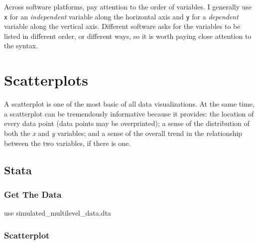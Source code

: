 \documentclass[
  letterpaper,
  DIV=11,
  numbers=noendperiod]{scrreprt}
\newenvironment{Shaded}{\begin{snugshade}}{\end{snugshade}}
\newcommand{\KeywordTok}[1]{\textcolor[rgb]{0.00,0.23,0.31}{#1}}
\newcommand{\NormalTok}[1]{\textcolor[rgb]{0.00,0.23,0.31}{#1}}
\begin{document}
\begin{tcolorbox}[enhanced jigsaw, coltitle=black, opacityback=0, title=\textcolor{quarto-callout-caution-color}{\faFire}\hspace{0.5em}{Order of Variables}, toprule=.15mm, colback=white, bottomrule=.15mm, colbacktitle=quarto-callout-caution-color!10!white, breakable, bottomtitle=1mm, arc=.35mm, left=2mm, colframe=quarto-callout-caution-color-frame, opacitybacktitle=0.6, leftrule=.75mm, titlerule=0mm, rightrule=.15mm, toptitle=1mm]

Across software platforms, pay attention to the order of variables. I
generally use \texttt{x} for an \emph{independent} variable along the
horizontal axis and \texttt{y} for a \emph{dependent} variable along the
vertical axis. Different software asks for the variables to be listed in
different order, or different ways, so it is worth paying close
attention to the syntax.

\end{tcolorbox}

\section{Scatterplots}\label{scatterplots}

A scatterplot is one of the most basic of all data visualizations. At
the same time, a scatterplot can be tremendously informative because it
provides: the location of every data point (data points may be
overprinted); a sense of the distribution of both the \emph{x} and
\emph{y} variables; and a sense of the overall trend in the relationship
between the two variables, if there is one.

\subsection{Stata}

\subsubsection{Get The Data}\label{get-the-data}

\begin{Shaded}
\begin{Highlighting}[]

\KeywordTok{use}\NormalTok{ simulated\_multilevel\_data.dta}
\end{Highlighting}
\end{Shaded}

\subsubsection{Scatterplot}\label{scatterplot}
\end{document}
